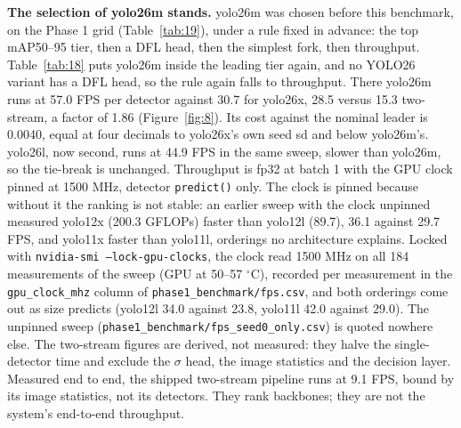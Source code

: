 \documentclass[10pt]{article}
\begin{document}
\textbf{The selection of yolo26m stands.} yolo26m was chosen before this benchmark, on the Phase 1 grid (Table~\ref{tab:19}), under a rule fixed in advance: the top mAP50--95 tier, then a DFL head, then the simplest fork, then throughput. Table~\ref{tab:18} puts yolo26m inside the leading tier again, and no YOLO26 variant has a DFL head, so the rule again falls to throughput. There yolo26m runs at 57.0 FPS per detector against 30.7 for yolo26x, 28.5 versus 15.3 two-stream, a factor of 1.86 (Figure~\ref{fig:8}). Its cost against the nominal leader is 0.0040, equal at four decimals to yolo26x's own seed sd and below yolo26m's. yolo26l, now second, runs at 44.9 FPS in the same sweep, slower than yolo26m, so the tie-break is unchanged. Throughput is fp32 at batch 1 with the GPU clock pinned at 1500 MHz, detector \texttt{predict()} only. The clock is pinned because without it the ranking is not stable: an earlier sweep with the clock unpinned measured yolo12x (200.3 GFLOPs) faster than yolo12l (89.7), 36.1 against 29.7 FPS, and yolo11x faster than yolo11l, orderings no architecture explains. Locked with \texttt{nvidia-smi --lock-gpu-clocks}, the clock read 1500 MHz on all 184 measurements of the sweep (GPU at 50--57 $^{\circ}$C), recorded per measurement in the \texttt{gpu\_\allowbreak{}clock\_\allowbreak{}mhz} column of \texttt{phase1\_\allowbreak{}benchmark/\allowbreak{}fps.csv}, and both orderings come out as size predicts (yolo12l 34.0 against 23.8, yolo11l 42.0 against 29.0). The unpinned sweep (\texttt{phase1\_\allowbreak{}benchmark/\allowbreak{}fps\_\allowbreak{}seed0\_\allowbreak{}only.csv}) is quoted nowhere else. The two-stream figures are derived, not measured: they halve the single-detector time and exclude the $\sigma$ head, the image statistics and the decision layer. Measured end to end, the shipped two-stream pipeline runs at 9.1 FPS, bound by its image statistics, not its detectors. They rank backbones; they are not the system's end-to-end throughput.
\end{document}
